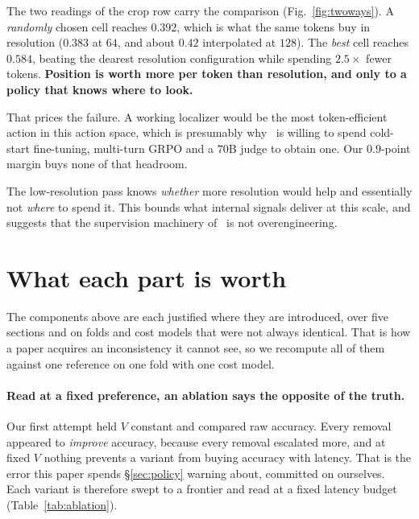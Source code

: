 \documentclass[10pt,twocolumn]{article}
\theoremstyle{plain}
\begin{document}
The two readings of the crop row carry the comparison (Fig.~\ref{fig:twoways}). A \emph{randomly} chosen
cell reaches $0.392$, which is what the same tokens buy in resolution
($0.383$ at $64$, and about $0.42$ interpolated at $128$). The \emph{best} cell
reaches $0.584$, beating the dearest resolution configuration while spending
$2.5\times$ fewer tokens. \textbf{Position is worth more per token than
resolution, and only to a policy that knows where to look.}

That prices the failure. A working localizer would be the most token-efficient
action in this action space, which is presumably why~\cite{awares} is willing to
spend cold-start fine-tuning, multi-turn GRPO and a $70$B judge to obtain one.
Our $0.9$-point margin buys none of that headroom.

The low-resolution pass knows \emph{whether} more resolution would help and
essentially not \emph{where} to spend it. This bounds what internal signals
deliver at this scale, and suggests that the supervision machinery
of~\cite{awares} is not overengineering.


\section{What each part is worth}
\label{sec:ablation}

The components above are each justified where they are introduced, over five
sections and on folds and cost models that were not always identical. That is
how a paper acquires an inconsistency it cannot see, so we recompute all of them
against one reference on one fold with one cost model.

\paragraph{Read at a fixed preference, an ablation says the opposite of the
truth.} Our first attempt held $V$ constant and compared raw accuracy. Every
removal appeared to \emph{improve} accuracy, because every removal escalated
more, and at fixed $V$ nothing prevents a variant from buying accuracy with
latency. That is the error this paper spends \S\ref{sec:policy} warning about,
committed on ourselves. Each variant is therefore swept to a frontier and read
at a fixed latency budget (Table~\ref{tab:ablation}).
\end{document}
